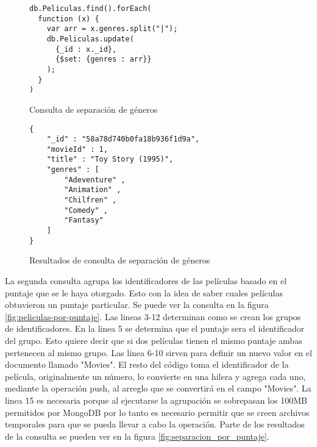 \documentclass[conference,compsoc]{sty/IEEEtran}
\begin{document}
\begin{figure}
    \begin{verbatim}
db.Peliculas.find().forEach(
  function (x) {
    var arr = x.genres.split("|");
    db.Peliculas.update(
      {_id : x._id},
      {$set: {genres : arr}}
    );
  }
)

\end{verbatim}
\caption{Consulta de separación de géneros} 
\label{fig:genre-split}
\end{figure}



\begin{figure}
    \begin{verbatim}
{
	"_id" : "58a78d740b0fa18b936f1d9a",
	"movieId" : 1,
	"title" : "Toy Story (1995)",
	"genres" : [
		"Adeventure" ,
		"Animation" ,
		"Chilfren" ,
		"Comedy" ,
		"Fantasy" 
	]
}

\end{verbatim}
\caption{Resultados de consulta de separación de géneros} 
\label{fig:separacion_genres}
\end{figure}

La segunda consulta agrupa los identificadores de las películas basado en el puntaje que se le haya otorgado. Esto con la idea de saber cuales películas obtuvieron un puntaje particular. Se puede ver la consulta en la figura \ref{fig:peliculas-por-puntaje}. Las lineas 3-12 determinan como se crean los grupos de identificadores. En la linea 5 se determina que el puntaje sera el identificador del grupo. Esto quiere decir que si dos películas tienen el mismo puntaje ambas pertenecen al mismo grupo. Las linea 6-10 sirven para definir un nuevo valor en el documento llamado "Movies". El resto del código toma el identificador de la película, originalmente un número, lo convierte en una hilera y agrega cada uno, mediante la operación push, al arreglo que se convertirá en el campo "Movies". La linea 15 es necesaria porque al ejecutarse la agrupación se sobrepasan los 100MB permitidos por MongoDB por lo tanto es necesario permitir que se creen archivos temporales para que se pueda llevar a cabo la operación. Parte de los resultados de la consulta se pueden ver en la figura \ref{fig:separacion_por_puntaje}.
\end{document}
